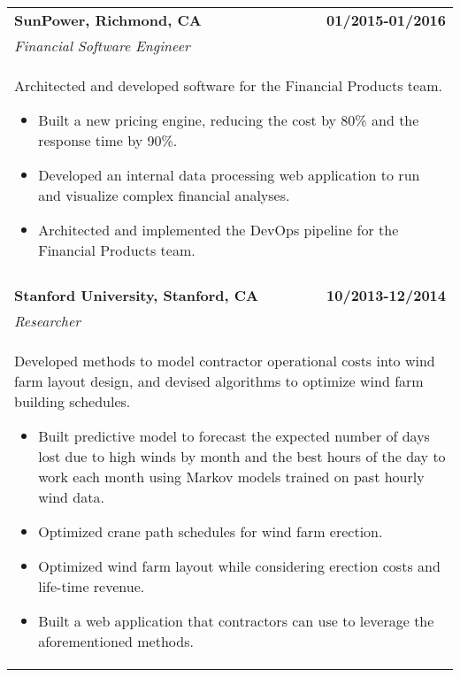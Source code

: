 \documentclass[a4paper,10pt]{article}
\begin{document}
\begin{tabularx}{\textwidth}{Xr}
\bf{SunPower}, Richmond, CA & \bf{01/2015-01/2016}\\
\emph{Financial Software Engineer} &\\
\multicolumn{2}{p{0.98\textwidth}}{
Architected and developed software for the Financial Products team. 
\begin{itemize}
	\item Built a new pricing engine, reducing the cost by 80\% and the response time by 90\%.
	\item Developed an internal data processing web application to run and visualize complex financial analyses.
	\item Architected and implemented the DevOps pipeline for the Financial Products team.
\end{itemize}
}\\
\multicolumn{2}{X}{} \\

\bf{Stanford University}, Stanford, CA & \bf{10/2013-12/2014}\\
\emph{Researcher} &\\
\multicolumn{2}{p{0.98\textwidth}}{
Developed methods to model contractor operational costs into wind farm layout design, and devised algorithms to optimize wind farm building schedules.
\begin{itemize} 
	\item Built predictive model to forecast the expected number of days lost due to high winds by month and the best hours of the day to work each month using Markov models trained on past hourly wind data. 
	\item Optimized crane path schedules for wind farm erection. 
	\item Optimized wind farm layout while considering erection costs and life-time revenue.
	\item Built a web application that contractors can use to leverage the aforementioned methods.
\end{itemize}
}\\



\end{tabularx}
\end{document}
